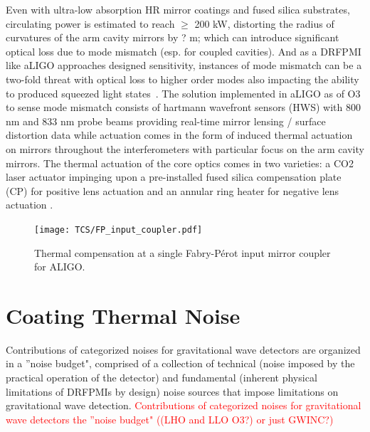 Even with ultra-low absorption HR mirror coatings and fused silica substrates, circulating power is estimated to reach $\geq$ 200 kW, distorting the radius of curvatures of the arm cavity mirrors by ? m; which can introduce significant optical loss due to mode mismatch (esp. for coupled cavities). And as a DRFPMI like aLIGO approaches designed sensitivity, instances of mode mismatch can be a two-fold threat with optical loss to higher order modes also impacting the ability to produced squeezed light states~\cite{}. The solution implemented in aLIGO as of O3 to sense mode mismatch consists of hartmann wavefront sensors (HWS) with 800 nm and 833 nm probe beams providing real-time mirror lensing / surface distortion data while actuation comes in the form of induced thermal actuation on mirrors throughout the interferometers with particular focus on the arm cavity mirrors. The thermal actuation of the core optics comes in two varieties: a CO2 laser actuator impinging upon a pre-installed fused silica compensation plate (CP) for positive lens actuation and an annular ring heater for negative lens actuation \cite{}. 

\begin{figure}[H]
	\texttt{[image: TCS/FP\_input\_coupler.pdf]}
\caption{Thermal compensation at a single Fabry-P\'{e}rot input mirror coupler for ALIGO.}
 \label{fig:meas}
\end{figure}

\section{Coating Thermal Noise}
Contributions of categorized noises for gravitational wave detectors are organized in a ''noise budget", comprised of a collection of technical (noise imposed by the practical operation of the detector) and fundamental (inherent physical limitations of DRFPMIs by design) noise sources that impose limitations on gravitational wave detection.
\textcolor{red}{Contributions of categorized noises for gravitational wave detectors the ''noise budget" ((LHO and LLO O3?) or just GWINC?)}

